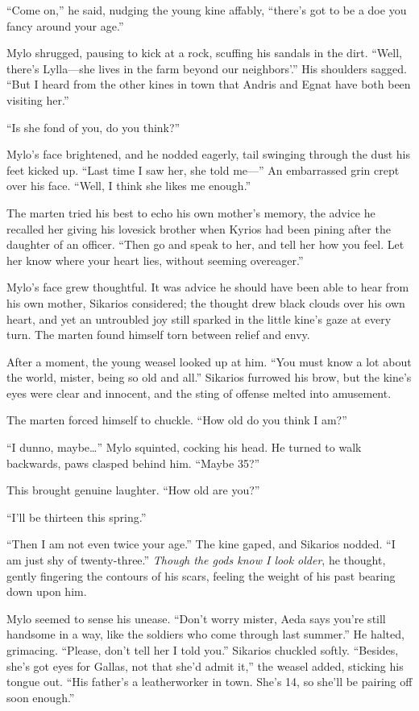 ``Come on,'' he said, nudging the young kine affably, ``there's got to be a doe you fancy around your age.''

Mylo shrugged, pausing to kick at a rock, scuffing his sandals in the dirt. ``Well, there's Lylla---she lives in the farm beyond our neighbors'.'' His shoulders sagged. ``But I heard from the other kines in town that Andris and Egnat have both been visiting her.''

``Is she fond of you, do you think?''

Mylo's face brightened, and he nodded eagerly, tail swinging through the dust his feet kicked up. ``Last time I saw her, she told me---'' An embarrassed grin crept over his face. ``Well, I think she likes me enough.''

The marten tried his best to echo his own mother's memory, the advice he recalled her giving his lovesick brother when Kyrios had been pining after the daughter of an officer. ``Then go and speak to her, and tell her how you feel. Let her know where your heart lies, without seeming overeager.''

Mylo's face grew thoughtful. It was advice he should have been able to hear from his own mother, Sikarios considered; the thought drew black clouds over his own heart, and yet an untroubled joy still sparked in the little kine's gaze at every turn. The marten found himself torn between relief and envy.

After a moment, the young weasel looked up at him. ``You must know a lot about the world, mister, being so old and all.'' Sikarios furrowed his brow, but the kine's eyes were clear and innocent, and the sting of offense melted into amusement.

The marten forced himself to chuckle. ``How old do you think I am?''

``I dunno, maybe\ldots'' Mylo squinted, cocking his head. He turned to walk backwards, paws clasped behind him. ``Maybe 35?''

This brought genuine laughter. ``How old are you?''

``I'll be thirteen this spring.''

``Then I am not even twice your age.'' The kine gaped, and Sikarios nodded. ``I am just shy of twenty-three.'' \emph{Though the gods know I look older}, he thought, gently fingering the contours of his scars, feeling the weight of his past bearing down upon him.

Mylo seemed to sense his unease. ``Don't worry mister, Aeda says you're still handsome in a way, like the soldiers who come through last summer.'' He halted, grimacing. ``Please, don't tell her I told you.'' Sikarios chuckled softly. ``Besides, she's got eyes for Gallas, not that she'd admit it,'' the weasel added, sticking his tongue out. ``His father's a leatherworker in town. She's 14, so she'll be pairing off soon enough.''

